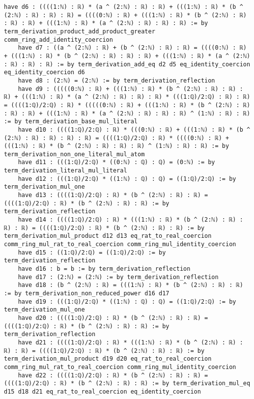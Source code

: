 \documentclass{article}
\begin{document}
\begin{tcolorbox}[colback=white!10, width=\linewidth]
\begin{lstlisting}[language=Lean4]
    have d6 : ((((1:ℕ) : ℝ) * (a ^ (2:ℕ) : ℝ) : ℝ) + (((1:ℕ) : ℝ) * (b ^ (2:ℕ) : ℝ) : ℝ) : ℝ) = ((((0:ℕ) : ℝ) + (((1:ℕ) : ℝ) * (b ^ (2:ℕ) : ℝ) : ℝ) : ℝ) + (((1:ℕ) : ℝ) * (a ^ (2:ℕ) : ℝ) : ℝ) : ℝ) := by term_derivation_product_add_product_greater comm_ring_add_identity_coercion
    have d7 : ((a ^ (2:ℕ) : ℝ) + (b ^ (2:ℕ) : ℝ) : ℝ) = ((((0:ℕ) : ℝ) + (((1:ℕ) : ℝ) * (b ^ (2:ℕ) : ℝ) : ℝ) : ℝ) + (((1:ℕ) : ℝ) * (a ^ (2:ℕ) : ℝ) : ℝ) : ℝ) := by term_derivation_add_eq d2 d5 eq_identity_coercion eq_identity_coercion d6
    have d8 : (2:ℕ) = (2:ℕ) := by term_derivation_reflection
    have d9 : (((((0:ℕ) : ℝ) + (((1:ℕ) : ℝ) * (b ^ (2:ℕ) : ℝ) : ℝ) : ℝ) + (((1:ℕ) : ℝ) * (a ^ (2:ℕ) : ℝ) : ℝ) : ℝ) * (((1:ℚ)/2:ℚ) : ℝ) : ℝ) = ((((1:ℚ)/2:ℚ) : ℝ) * (((((0:ℕ) : ℝ) + (((1:ℕ) : ℝ) * (b ^ (2:ℕ) : ℝ) : ℝ) : ℝ) + (((1:ℕ) : ℝ) * (a ^ (2:ℕ) : ℝ) : ℝ) : ℝ) ^ (1:ℕ) : ℝ) : ℝ) := by term_derivation_base_mul_literal
    have d10 : ((((1:ℚ)/2:ℚ) : ℝ) * (((0:ℕ) : ℝ) + (((1:ℕ) : ℝ) * (b ^ (2:ℕ) : ℝ) : ℝ) : ℝ) : ℝ) = ((((1:ℚ)/2:ℚ) : ℝ) * ((((0:ℕ) : ℝ) + (((1:ℕ) : ℝ) * (b ^ (2:ℕ) : ℝ) : ℝ) : ℝ) ^ (1:ℕ) : ℝ) : ℝ) := by term_derivation_non_one_literal_mul_atom
    have d11 : (((1:ℚ)/2:ℚ) * ((0:ℕ) : ℚ) : ℚ) = (0:ℕ) := by term_derivation_literal_mul_literal
    have d12 : (((1:ℚ)/2:ℚ) * ((1:ℕ) : ℚ) : ℚ) = ((1:ℚ)/2:ℚ) := by term_derivation_mul_one
    have d13 : ((((1:ℚ)/2:ℚ) : ℝ) * (b ^ (2:ℕ) : ℝ) : ℝ) = ((((1:ℚ)/2:ℚ) : ℝ) * (b ^ (2:ℕ) : ℝ) : ℝ) := by term_derivation_reflection
    have d14 : ((((1:ℚ)/2:ℚ) : ℝ) * (((1:ℕ) : ℝ) * (b ^ (2:ℕ) : ℝ) : ℝ) : ℝ) = ((((1:ℚ)/2:ℚ) : ℝ) * (b ^ (2:ℕ) : ℝ) : ℝ) := by term_derivation_mul_product d12 d13 eq_rat_to_real_coercion comm_ring_mul_rat_to_real_coercion comm_ring_mul_identity_coercion
    have d15 : ((1:ℚ)/2:ℚ) = ((1:ℚ)/2:ℚ) := by term_derivation_reflection
    have d16 : b = b := by term_derivation_reflection
    have d17 : (2:ℕ) = (2:ℕ) := by term_derivation_reflection
    have d18 : (b ^ (2:ℕ) : ℝ) = (((1:ℕ) : ℝ) * (b ^ (2:ℕ) : ℝ) : ℝ) := by term_derivation_non_reduced_power d16 d17
    have d19 : (((1:ℚ)/2:ℚ) * ((1:ℕ) : ℚ) : ℚ) = ((1:ℚ)/2:ℚ) := by term_derivation_mul_one
    have d20 : ((((1:ℚ)/2:ℚ) : ℝ) * (b ^ (2:ℕ) : ℝ) : ℝ) = ((((1:ℚ)/2:ℚ) : ℝ) * (b ^ (2:ℕ) : ℝ) : ℝ) := by term_derivation_reflection
    have d21 : ((((1:ℚ)/2:ℚ) : ℝ) * (((1:ℕ) : ℝ) * (b ^ (2:ℕ) : ℝ) : ℝ) : ℝ) = ((((1:ℚ)/2:ℚ) : ℝ) * (b ^ (2:ℕ) : ℝ) : ℝ) := by term_derivation_mul_product d19 d20 eq_rat_to_real_coercion comm_ring_mul_rat_to_real_coercion comm_ring_mul_identity_coercion
    have d22 : ((((1:ℚ)/2:ℚ) : ℝ) * (b ^ (2:ℕ) : ℝ) : ℝ) = ((((1:ℚ)/2:ℚ) : ℝ) * (b ^ (2:ℕ) : ℝ) : ℝ) := by term_derivation_mul_eq d15 d18 d21 eq_rat_to_real_coercion eq_identity_coercion

\end{lstlisting}
\end{tcolorbox}
\end{document}
